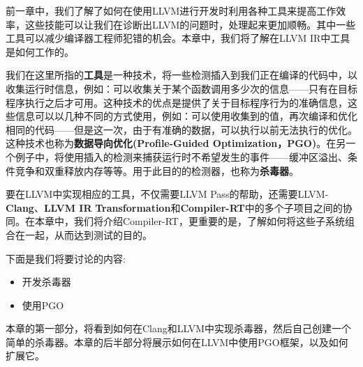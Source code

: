 前一章中，我们了解了如何在使用LLVM进行开发时利用各种工具来提高工作效率，这些技能可以让我们在诊断出LLVM的问题时，处理起来更加顺畅。其中一些工具可以减少编译器工程师犯错的机会。本章中，我们将了解在LLVM IR中工具是如何工作的。

我们在这里所指的\textbf{工具}是一种技术，将一些检测插入到我们正在编译的代码中，以收集运行时信息，例如：可以收集关于某个函数调用多少次的信息——只有在目标程序执行之后才可用。这种技术的优点是提供了关于目标程序行为的准确信息，这些信息可以以几种不同的方式使用，例如：可以使用收集到的值，再次编译和优化相同的代码——但是这一次，由于有准确的数据，可以执行以前无法执行的优化。这种技术也称为\textbf{数据导向优化(Profile-Guided Optimization，PGO)}。在另一个例子中，将使用插入的检测来捕获运行时不希望发生的事件——缓冲区溢出、条件竞争和双重释放内存等等。用于此目的的检测器，也称为\textbf{杀毒器}。

要在LLVM中实现相应的工具，不仅需要LLVM Pass的帮助，还需要LLVM-\textbf{Clang}、\textbf{LLVM IR} \textbf{Transformation}和\textbf{Compiler-RT}中的多个子项目之间的协同。在本章中，我们将介绍Compiler-RT，更重要的是，了解如何将这些子系统组合在一起，从而达到测试的目的。

下面是我们将要讨论的内容:

\begin{itemize}
\item 开发杀毒器
\item 使用PGO
\end{itemize}

本章的第一部分，将看到如何在Clang和LLVM中实现杀毒器，然后自己创建一个简单的杀毒器。本章的后半部分将展示如何在LLVM中使用PGO框架，以及如何扩展它。






